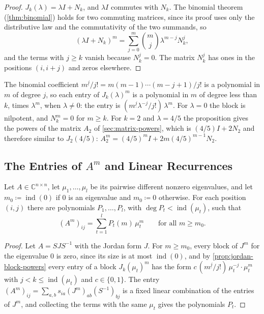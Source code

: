 \begin{proof}
$J_k(\lambda)=\lambda I+N_k$, and $\lambda I$ commutes with $N_k$. The binomial theorem (\cref{thm:binomial}) holds for two commuting matrices, since its proof uses only the distributive law and the commutativity of the two summands, so
\[
(\lambda I+N_k)^m=\sum_{j=0}^m\binom mj\lambda^{m-j}N_k^j ,
\]
and the terms with $j\ge k$ vanish because $N_k^j=0$. The matrix $N_k^j$ has ones in the positions $(i,i+j)$ and zeros elsewhere.
\end{proof}

The binomial coefficient $m^{\underline j}/j!=m(m-1)\cdots(m-j+1)/j!$ is a polynomial in $m$ of degree $j$, so each entry of $J_k(\lambda)^m$ is a polynomial in $m$ of degree less than $k$, times $\lambda^m$, when $\lambda\ne0$: the entry is $(m^{\underline j}\lambda^{-j}/j!)\,\lambda^m$. For $\lambda=0$ the block is nilpotent, and $N_k^m=0$ for $m\ge k$. For $k=2$ and $\lambda=4/5$ the proposition gives the powers of the matrix $A_2$ of \cref{sec:matrix-powers}, which is $(4/5)I+2N_2$ and therefore similar to $J_2(4/5)$: $A_2^m=(4/5)^mI+2m(4/5)^{m-1}N_2$.

\subsection{The Entries of \texorpdfstring{$A^m$}{Am} and Linear Recurrences}

\begin{theorem}
\label{thm:power-entries}
Let $A\in\mathbb C^{n\times n}$, let $\mu_1,\ldots,\mu_l$ be its pairwise different nonzero eigenvalues, and let $m_0\coloneqq\operatorname{ind}(0)$ if $0$ is an eigenvalue and $m_0\coloneqq0$ otherwise. For each position $(i,j)$ there are polynomials $P_1,\ldots,P_l$, with $\deg P_t<\operatorname{ind}(\mu_t)$, such that
\[
(A^m)_{ij}=\sum_{t=1}^lP_t(m)\,\mu_t^m\qquad\text{for all }m\ge m_0 .
\]
\end{theorem}

\begin{proof}
Let $A=SJS^{-1}$ with the Jordan form $J$. For $m\ge m_0$, every block of $J^m$ for the eigenvalue $0$ is zero, since its size is at most $\operatorname{ind}(0)$, and by \cref{prop:jordan-block-powers} every entry of a block $J_k(\mu_t)^m$ has the form $c\,(m^{\underline j}/j!)\,\mu_t^{-j}\cdot\mu_t^m$ with $j<k\le\operatorname{ind}(\mu_t)$ and $c\in\{0,1\}$. The entry $(A^m)_{ij}=\sum_{a,b}s_{ia}(J^m)_{ab}(S^{-1})_{bj}$ is a fixed linear combination of the entries of $J^m$, and collecting the terms with the same $\mu_t$ gives the polynomials $P_t$.
\end{proof}

